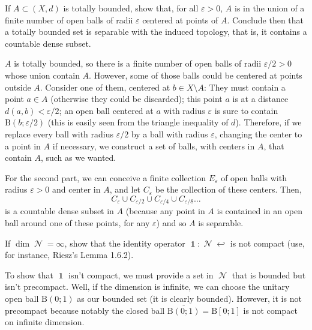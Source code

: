 \documentclass{article}
\theoremstyle{exercisestyle}
\newenvironment{exercise}[1]
  {\renewcommand\theinnerex{#1}\innerex}
  {\endinnerex}
\newcommand{\closure}[1]{\overline{ #1}}
\newcommand{\openball}[2]{\text{B}\left(#1;#2\right)}
\newcommand{\closedball}[2]{\text{B}\left[#1;#2\right]}
\DeclareMathOperator{\normed}{\mathcal{N}}
\DeclareMathOperator{\id}{\textbf{1}}
\begin{document}
\begin{exercise}{1.3.2}
    If $A \subset (X, d)$ is totally bounded, show that, for all $\varepsilon > 0$, $A$ is in the union of a finite number of open balls of radii $\varepsilon$ centered at points of $A$.
    Conclude then that a totally bounded set is separable with the induced topology, that is, it contains a countable dense subset.

    $A$ is totally bounded, so there is a finite number of open balls of radii $\varepsilon/2 > 0$ whose union contain $A$.
    However, some of those balls could be centered at points outside $A$.
    Consider one of them, centered at $b \in X\setminus A$: They must contain a point $a \in A$ (otherwise they could be discarded);
    this point $a$ is at a distance $d(a,b)<\varepsilon/2$;
    an open ball centered at $a$ with radius $\varepsilon$ is sure to contain $\openball{b}{\varepsilon/2}$ (this is easily seen from the triangle inequality of $d$).
    Therefore, if we replace every ball with radius $\varepsilon/2$ by a ball with radius $\varepsilon$, changing the center to a point in $A$ if necessary,
    we construct a set of balls, with centers in $A$, that contain $A$, such as we wanted.

    For the second part, we can conceive a finite collection $E_\varepsilon$ of open balls with radius $\varepsilon > 0$ and center in $A$,
    and let $C_\varepsilon$ be the collection of these centers. Then,
    $$ C_\varepsilon \cup C_{\varepsilon/2} \cup C_{\varepsilon/4} \cup C_{\varepsilon/8} \dots$$ 
    is a countable dense subset in $A$ (because any point in $A$ is contained in an open ball around one of these points, for any $\varepsilon$) and so $A$ is separable.


\end{exercise}

\begin{exercise}{1.3.6}
    If $\dim \normed = \infty$, show that the identity operator $\id : \normed \hookleftarrow$ is not compact (use, for instance, Riesz’s Lemma 1.6.2).

    To show that $\id$ isn't compact, we must provide a set in $\normed$ that is bounded but isn't precompact. Well, if the dimension is infinite, we can choose
    the unitary open ball $\openball{0}{1}$ as our bounded set (it is clearly bounded). However, it is not precompact because notably the closed ball 
    $ \closure{\openball{0}{1}} = \closedball{0}{1}$ is not compact on infinite dimension.

\end{exercise}
\end{document}
